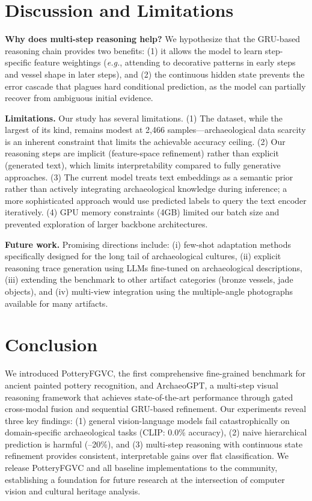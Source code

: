 \documentclass[10pt,twocolumn,letterpaper]{article}
\begin{document}
\section{Discussion and Limitations}
\label{sec:discussion}

\textbf{Why does multi-step reasoning help?} We hypothesize that the GRU-based reasoning chain provides two benefits: (1) it allows the model to learn step-specific feature weightings (\emph{e.g.}, attending to decorative patterns in early steps and vessel shape in later steps), and (2) the continuous hidden state prevents the error cascade that plagues hard conditional prediction, as the model can partially recover from ambiguous initial evidence.

\textbf{Limitations.} Our study has several limitations. (1) The dataset, while the largest of its kind, remains modest at 2,466 samples---archaeological data scarcity is an inherent constraint that limits the achievable accuracy ceiling. (2) Our reasoning steps are implicit (feature-space refinement) rather than explicit (generated text), which limits interpretability compared to fully generative approaches. (3) The current model treats text embeddings as a semantic prior rather than actively integrating archaeological knowledge during inference; a more sophisticated approach would use predicted labels to query the text encoder iteratively. (4) GPU memory constraints (4GB) limited our batch size and prevented exploration of larger backbone architectures.

\textbf{Future work.} Promising directions include: (i) few-shot adaptation methods specifically designed for the long tail of archaeological cultures, (ii) explicit reasoning trace generation using LLMs fine-tuned on archaeological descriptions, (iii) extending the benchmark to other artifact categories (bronze vessels, jade objects), and (iv) multi-view integration using the multiple-angle photographs available for many artifacts.

\section{Conclusion}
\label{sec:conclusion}

We introduced PotteryFGVC, the first comprehensive fine-grained benchmark for ancient painted pottery recognition, and ArchaeoGPT, a multi-step visual reasoning framework that achieves state-of-the-art performance through gated cross-modal fusion and sequential GRU-based refinement. Our experiments reveal three key findings: (1) general vision-language models fail catastrophically on domain-specific archaeological tasks (CLIP: 0.0\% accuracy), (2) naive hierarchical prediction is harmful (--20\%), and (3) multi-step reasoning with continuous state refinement provides consistent, interpretable gains over flat classification. We release PotteryFGVC and all baseline implementations to the community, establishing a foundation for future research at the intersection of computer vision and cultural heritage analysis.

{\small


}
\end{document}

